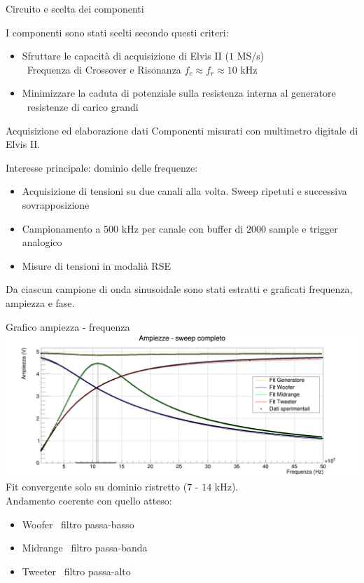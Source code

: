 \documentclass[italian]{beamer}
\begin{document}
\begin{frame}{Circuito e scelta dei componenti}
    \bigskip

    I componenti sono stati scelti secondo questi criteri:
    \begin{itemize}
        \item Sfruttare le capacità di acquisizione di Elvis II ($1$ MS/s)\\
              \Rightarrow\ Frequenza di Crossover e Risonanza $f_c \approx f_r \approx 10$ kHz
        \item Minimizzare la caduta di potenziale sulla resistenza interna al generatore
              \Rightarrow\ resistenze di carico grandi
    \end{itemize}
\end{frame}

\begin{frame}{Acquisizione ed elaborazione dati}
    Componenti misurati con multimetro digitale di Elvis II.

    \bigskip
    Interesse principale: dominio delle frequenze:
    \begin{itemize}
        \item Acquisizione di tensioni su due canali alla volta. Sweep ripetuti e successiva sovrapposizione
        \item Campionamento a $500$ kHz per canale con buffer di $2000$ sample e trigger analogico
        \item Misure di tensioni in modalià RSE
    \end{itemize}

    Da ciascun campione di onda sinusoidale sono stati estratti e graficati frequenza, ampiezza e fase.
\end{frame}

\begin{frame}{Grafico ampiezza - frequenza}
    \includegraphics[width=\textwidth]{fig_amp.png}
    Fit convergente solo su dominio ristretto ($7$ - $14$ kHz).\\
    Andamento coerente con quello atteso:
    \begin{itemize}
        \item[\checkmark] Woofer \rightarrow\ filtro passa-basso
        \item[\checkmark] Midrange \rightarrow\ filtro passa-banda
        \item[\checkmark] Tweeter \rightarrow\ filtro passa-alto
    \end{itemize}
\end{frame}
\end{document}

